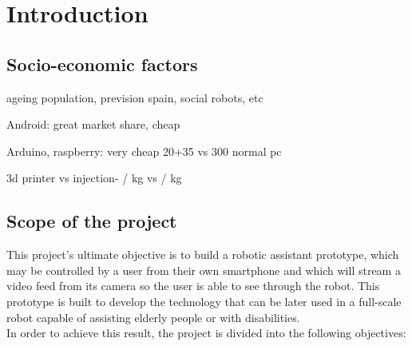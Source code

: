 \section{Introduction}




\subsection{Socio-economic factors}

ageing population, prevision spain, social robots, etc


Android: great market share, cheap

Arduino, raspberry: very cheap 20+35  vs 300 normal pc

3d printer vs injection- / kg vs / kg



\subsection{Scope of the project}

This project's ultimate objective is to build a robotic assistant prototype, which may be controlled by a user from their own smartphone and which will stream a video feed from its camera so the user is able to see through the robot. This prototype is built to develop the technology that can be later used in a full-scale robot capable of assisting elderly people or with disabilities.\\

In order to achieve this result, the project is divided into the following objectives:

